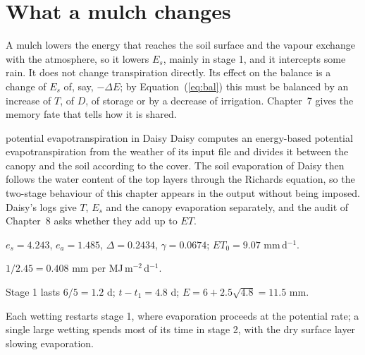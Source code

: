 
\section{What a mulch changes}
A mulch lowers the energy that reaches the soil surface and the vapour exchange with the atmosphere, so it lowers $E_s$, mainly in stage 1, and it intercepts some rain. It does not change transpiration directly. Its effect on the balance is a change of $E_s$ of, say, $-\Delta E$; by Equation~(\ref{eq:bal}) this must be balanced by an increase of $T$, of $D$, of storage or by a decrease of irrigation. Chapter~7 gives the memory fate that tells how it is shared.

\begin{daisybox}{potential evapotranspiration in Daisy}
Daisy computes an energy-based potential evapotranspiration from the weather of its input file and divides it between the canopy and the soil according to the cover. The soil evaporation of Daisy then follows the water content of the top layers through the Richards equation, so the two-stage behaviour of this chapter appears in the output without being imposed. Daisy's logs give $T$, $E_s$ and the canopy evaporation separately, and the audit of Chapter~8 asks whether they add up to $ET$.
\end{daisybox}

\sol  $e_s=4.243$, $e_a=1.485$, $\Delta=0.2434$, $\gamma=0.0674$; $ET_0=9.07$ mm\,d$^{-1}$.

\sol  $1/2.45=0.408$ mm per MJ\,m$^{-2}$\,d$^{-1}$.

\sol  Stage 1 lasts $6/5=1.2$ d; $t-t_1=4.8$ d; $E=6+2.5\sqrt{4.8}=11.5$ mm.

\sol  Each wetting restarts stage 1, where evaporation proceeds at the potential rate; a single large wetting spends most of its time in stage 2, with the dry surface layer slowing evaporation.


